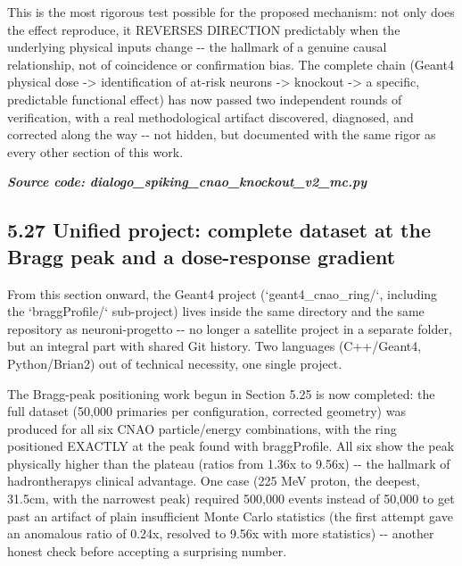 \documentclass[
  english,
]{article}
\begin{document}
This is the most rigorous test possible for the proposed mechanism: not only does the effect reproduce, it REVERSES DIRECTION predictably when the underlying physical inputs change -\/- the hallmark of a genuine causal relationship, not of coincidence or confirmation bias. The complete chain (Geant4 physical dose -\textgreater{} identification of at-risk neurons -\textgreater{} knockout -\textgreater{} a specific, predictable functional effect) has now passed two independent rounds of verification, with a real methodological artifact discovered, diagnosed, and corrected along the way -\/- not hidden, but documented with the same rigor as every other section of this work.

\textit{\textbf{Source code: dialogo\_\allowbreak{}spiking\_\allowbreak{}cnao\_\allowbreak{}knockout\_\allowbreak{}v2\_\allowbreak{}mc.py}}


\subsection{5.27 Unified project: complete dataset at the Bragg peak and a dose-response gradient}\label{unified-project-complete-dataset-at-the-bragg-peak-and-a-dose-response-gradient}

From this section onward, the Geant4 project (`geant4\_\allowbreak{}cnao\_\allowbreak{}ring/`, including the `braggProfile/` sub-project) lives inside the same directory and the same repository as neuroni-progetto -\/- no longer a satellite project in a separate folder, but an integral part with shared Git history. Two languages (C++/Geant4, Python/Brian2) out of technical necessity, one single project.

The Bragg-peak positioning work begun in Section 5.25 is now completed: the full dataset (50,000 primaries per configuration, corrected geometry) was produced for all six CNAO particle/energy combinations, with the ring positioned EXACTLY at the peak found with braggProfile. All six show the peak physically higher than the plateau (ratios from 1.36x to 9.56x) -\/- the hallmark of hadrontherapy\textquotesingle s clinical advantage. One case (225 MeV proton, the deepest, 31.5cm, with the narrowest peak) required 500,000 events instead of 50,000 to get past an artifact of plain insufficient Monte Carlo statistics (the first attempt gave an anomalous ratio of 0.24x, resolved to 9.56x with more statistics) -\/- another honest check before accepting a surprising number.
\end{document}
